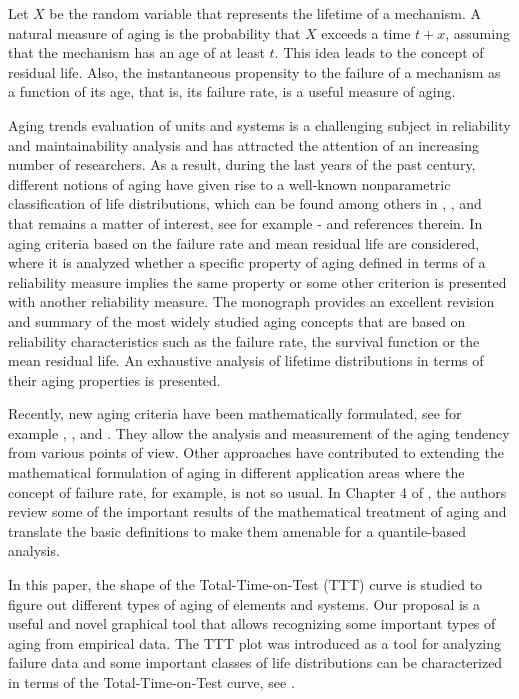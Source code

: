 \documentclass[preprint,12pt]{elsarticle}
\begin{document}
Let $X$ be the random variable that represents the lifetime of a mechanism. A natural measure of aging is the probability that $X$ exceeds a time $t + x$, assuming that the mechanism has an age of at least $t$. This idea leads to the concept of residual life. Also, the instantaneous propensity to the failure of a mechanism as a function of its age, that is, its failure rate, is a useful measure of aging. 
 
Aging trends evaluation of units and systems is a challenging subject in reliability and maintainability analysis and has attracted the attention of an increasing number of researchers. As a  result,  during the last years of the past century, different notions of aging  have given rise to a well-known nonparametric classification of life distributions,  which can be found among others in  \cite{BP75}, \cite{RH04}, and that remains a matter of interest, see for example \cite{KM2019}-\cite{KBM2020}  and references therein. In \cite{Lillo00} aging criteria based on the failure rate and mean residual life are considered, where it is analyzed whether a specific property of aging defined in terms of a reliability measure implies the same property or some other criterion is presented with another reliability measure. The monograph \cite{LX06}  provides an excellent revision and summary of the most widely studied aging concepts that are based on reliability characteristics such as the failure rate, the survival function or the mean residual life.  An exhaustive analysis of lifetime distributions in terms of their aging properties is presented.

Recently, new aging criteria have been mathematically formulated, see for example \cite{FPS2014}, \cite{NASS2014},  and \cite{Sz2018b}. They allow the analysis and measurement of the aging tendency from various points of view. Other approaches have  contributed to extending the mathematical formulation of aging in different application areas where the concept of failure rate, for example, is not so usual. In Chapter 4 of \cite{NSB2013}, the authors review some of the important results of the mathematical treatment of aging and translate the basic definitions to make them amenable for a quantile-based analysis. 

In this paper, the shape of the Total-Time-on-Test (TTT) curve is studied to figure out different types of aging of elements and systems. Our proposal is a useful and novel graphical tool that allows recognizing some important types of aging from empirical data.
The TTT plot was introduced  as a tool for analyzing failure data and some important classes of life distributions can be characterized in terms of the Total-Time-on-Test curve, see \cite{Klefsjo82}. 
\end{document}
